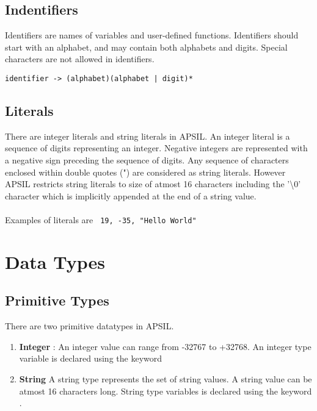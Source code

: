\subsection{Indentifiers}

Identifiers are names of variables and user-defined functions. Identifiers should start with an alphabet, and may contain both alphabets and digits. Special characters are not allowed in identifiers.
\begin{verbatim}
identifier -> (alphabet)(alphabet | digit)*
\end{verbatim}




\subsection{Literals}
There are integer literals and string literals in APSIL. An integer literal is a sequence of digits representing an integer.
Negative integers are represented with a negative sign preceding the sequence of digits. Any sequence of characters enclosed within double quotes (") are considered as string literals. However APSIL restricts string literals to size of atmost 16 characters including the '\textbackslash 0' character which is implicitly appended at the end of a string value. 
\\
\\
Examples of literals are \texttt{
 19, -35, "Hello World"}


\section{Data Types}

\subsection{Primitive Types}
There are two primitive datatypes in APSIL. 
\begin{enumerate}

\item \textbf{Integer} : An integer value can range from -32767 to +32768. An integer type variable is declared using the keyword 
\item \textbf{String}  
A string type represents the set of string values. A string value can be atmost 16 characters long. String type variables is declared using the keyword .
\end{enumerate}


